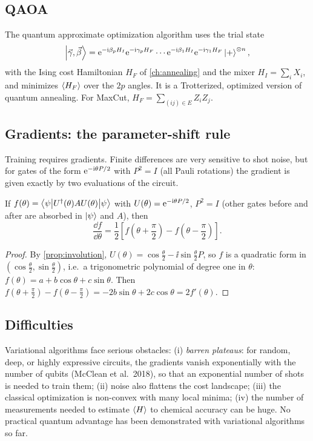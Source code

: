 \subsection{QAOA}
The quantum approximate optimization algorithm uses the trial state
\begin{equation}
  \left|\vec\gamma,\vec\beta\right\rangle=\mathrm e^{-\mathrm i\beta_pH_I}\mathrm e^{-\mathrm i\gamma_pH_F}\cdots\mathrm e^{-\mathrm i\beta_1H_I}\mathrm e^{-\mathrm i\gamma_1H_F}\left|+\right\rangle^{\otimes n},
\end{equation}
with the Ising cost Hamiltonian $H_F$ of \cref{ch:annealing} and the mixer $H_I=\sum_iX_i$, and minimizes $\left\langle H_F\right\rangle$ over the $2p$ angles. It is a Trotterized, optimized version of quantum annealing. For MaxCut, $H_F=\sum_{(ij)\in E}Z_iZ_j$.

\subsection{Gradients: the parameter-shift rule}
Training requires gradients. Finite differences are very sensitive to shot noise, but for gates of the form $\mathrm e^{-\mathrm i\theta P/2}$ with $P^2=I$ (all Pauli rotations) the gradient is given exactly by two evaluations of the circuit.
\begin{proposition}
If $f(\theta)=\left\langle\psi\middle|U^\dagger(\theta)AU(\theta)\middle|\psi\right\rangle$ with $U(\theta)=\mathrm e^{-\mathrm i\theta P/2}$, $P^2=I$ (other gates before and after are absorbed in $\left|\psi\right\rangle$ and $A$), then
\begin{equation}
  \frac{\dd f}{\dd\theta}=\frac12\left[f\left(\theta+\frac\pi2\right)-f\left(\theta-\frac\pi2\right)\right].
\end{equation}
\end{proposition}
\begin{proof}
By \cref{prop:involution}, $U(\theta)=\cos\frac\theta2-\ii\sin\frac\theta2P$, so $f$ is a quadratic form in $(\cos\frac\theta2,\sin\frac\theta2)$, i.e.\ a trigonometric polynomial of degree one in $\theta$: $f(\theta)=a+b\cos\theta+c\sin\theta$.
Then $f(\theta+\frac\pi2)-f(\theta-\frac\pi2)=-2b\sin\theta+2c\cos\theta=2f'(\theta)$.
\end{proof}

\subsection{Difficulties}
Variational algorithms face serious obstacles: (i) \emph{barren plateaus}: for random, deep, or highly expressive circuits, the gradients vanish exponentially with the number of qubits (McClean et al.\ 2018), so that an exponential number of
shots is needed to train them; (ii) noise also flattens the cost landscape; (iii) the classical optimization is non-convex with many local minima; (iv) the number of measurements needed to estimate $\left\langle H\right\rangle$ to chemical accuracy can be huge.
No practical quantum advantage has been demonstrated with variational algorithms so far.

